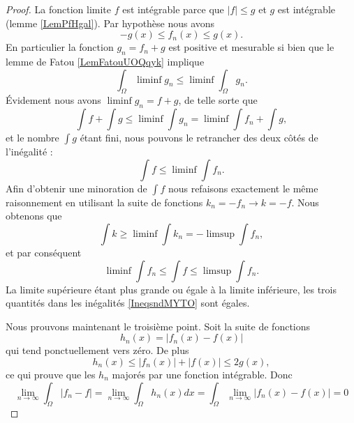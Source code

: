 \begin{proof}

    La fonction limite \( f\) est intégrable parce que \( | f |\leq g\) et \( g\) est intégrable (lemme \ref{LemPfHgal}). Par hypothèse nous avons
    \begin{equation}
        -g(x)\leq f_n(x)\leq g(x).
    \end{equation}
    En particulier la fonction \( g_n=f_n+g\) est positive et mesurable si bien que le lemme de Fatou \ref{LemFatouUOQqyk} implique
    \begin{equation}
        \int_{\Omega}\liminf g_n\leq\liminf\int_{\Omega}g_n.
    \end{equation}
    Évidement nous avons \( \liminf g_n=f+g\), de telle sorte que
    \begin{equation}
        \int f+\int g\leq \liminf\int g_n=\liminf\int f_n+\int g,
    \end{equation}
    et le nombre \( \int g\) étant fini, nous pouvons le retrancher des deux côtés de l'inégalité :
    \begin{equation}
        \int f\leq\liminf\int f_n.
    \end{equation}
    Afin d'obtenir une minoration de \( \int f\) nous refaisons exactement le même raisonnement en utilisant la suite de fonctions \( k_n=-f_n\to k=-f\). Nous obtenons que
    \begin{equation}
        \int k\geq\liminf\int k_n=-\limsup\int f_n,
    \end{equation}
    et par conséquent
    \begin{equation}    \label{IneqsndMYTO}
        \liminf\int f_n\leq\int f\leq\limsup\int f_n.
    \end{equation}
    La limite supérieure étant plus grande ou égale à la limite inférieure, les trois quantités dans les inégalités \eqref{IneqsndMYTO} sont égales.

    Nous prouvons maintenant le troisième point. Soit la suite de fonctions
    \begin{equation}
        h_n(x)=| f_n(x)-f(x) |
    \end{equation}
    qui tend ponctuellement vers zéro. De plus
    \begin{equation}
    h_n(x)\leq | f_n(x) |+| f(x) |\leq 2g(x),
    \end{equation}
    ce qui prouve que les \( h_n\) majorés par une fonction intégrable. Donc
    \begin{equation}
        \lim_{n\to \infty} \int_{\Omega}| f_n-f |= \lim_{n\to \infty} \int_{\Omega}h_n(x)dx=\int_{\Omega}\lim_{n\to \infty} | f_n(x)-f(x) |=0
    \end{equation}
\end{proof}

